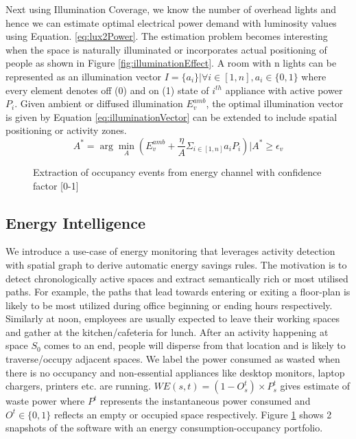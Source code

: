 Next using Illumination Coverage, we know the number of overhead lights and hence we can estimate optimal electrical power demand with luminosity values using Equation. \ref{eq:lux2Power}. The estimation problem becomes interesting when the space is naturally illuminated or incorporates actual positioning of people as shown in Figure \ref{fig:illuminationEffect}. A room with n lights can be represented as an illumination vector $I = \{a_i\} | \forall i \in [1, n], a_i \in \{0,1\}$ where every element denotes off (0) and on (1) state of $i ^{th}$ appliance with active power $P_i$. Given ambient or diffused illumination $E_v^{amb}$, the optimal illumination vector is given by Equation \ref{eq:illuminationVector} can be extended to include spatial positioning or activity zones.
\begin{equation}
A^* = \arg \min_{A} (E_v^{amb} +  \frac{\eta}{A}\Sigma_{i \in [1,n]}  a_i P_i  ) | A^* \geq \epsilon_v
\label{eq:illuminationVector}
\end{equation}

\begin{figure}
     \centering
      \caption{Extraction of occupancy events from energy channel with confidence factor [0-1] }%
    \label{fig:occupancy-features}%
\end{figure}



\subsection{Energy Intelligence}




We introduce a use-case of energy monitoring that leverages activity detection with spatial graph to derive automatic energy savings rules. The motivation is to detect chronologically active spaces and extract semantically rich or most utilised paths. For example, the paths that lead towards entering or exiting a floor-plan is likely to be most utilized during office beginning or ending hours respectively. Similarly at noon, employees are usually expected to leave their working spaces and gather at the kitchen/cafeteria for lunch. After an activity happening at space $S_0$ comes to an end, people will disperse from that location and is likely to traverse/occupy adjacent spaces. We label the power consumed as wasted when there is no occupancy and non-essential appliances like desktop monitors, laptop chargers, printers etc. are running. $WE(s, t) =  (1-O_s^t) \times P^t_s$ gives estimate of waste power where $P^t$ represents the instantaneous power consumed and $O^t \in \{0,1\}$ reflects an empty or occupied space respectively. Figure \ref{fig:occupancy-features} shows 2 snapshots of the software with an energy consumption-occupancy portfolio.


